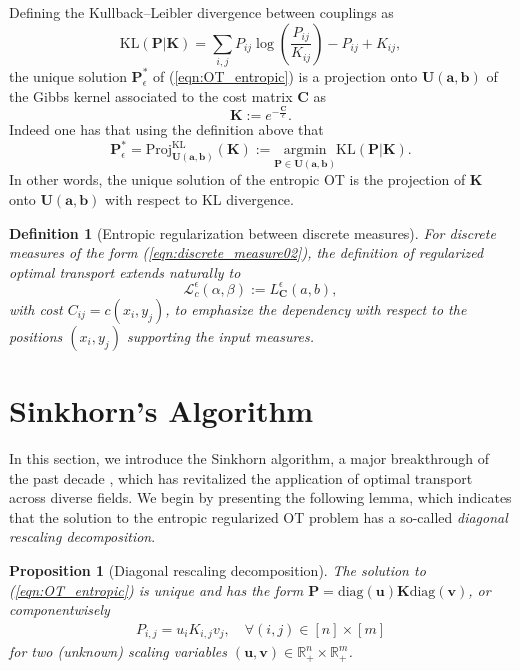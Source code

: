 \documentclass[11pt]{book}
\newtheorem{proposition}[theorem]{Proposition}
\newtheorem{definition}[theorem]{Definition}
\begin{document}
Defining the Kullback--Leibler divergence between couplings as
\begin{equation}
\text{KL}(\mathbf{P}|\mathbf{K}) = \sum_{i,j} P_{ij} \log \left(\frac{P_{ij}}{K_{ij}}\right) -P_{ij} + K_{ij}, \tag{4.6}
\end{equation}
the unique solution \(\mathbf{P}^*_{\epsilon}\) of (\ref{eqn:OT_entropic}) is a projection onto \(\mathbf{U}(\mathbf{a}, \mathbf{b})\) of the Gibbs kernel associated to the cost matrix \(\mathbf{C}\) as
\[
\mathbf{K} := e^{-\frac{\mathbf{C}}{\epsilon}}.
\]
Indeed one has that using the definition above that
\begin{equation}\label{eqn:KL_proj}
\mathbf{P}^*_{\epsilon} = \text{Proj}_{\mathbf{U}(\mathbf{a},\mathbf{b})}^{\text{KL}}(\mathbf{K}) := \underset{ \mathbf{P} \in \mathbf{U}(\mathbf{a},\mathbf{b})}{\mathrm{argmin}} \text{KL}(\mathbf{P} | \mathbf{K}).
\end{equation}
In other words, the unique solution of the entropic OT is the projection of $\mathbf{K}$ onto $\mathbf{U}(\mathbf{a},\mathbf{b})$ with respect to KL divergence.

\begin{definition}[Entropic regularization between discrete measures]
For discrete measures of the form (\ref{eqn:discrete_measure02}), the definition of regularized optimal transport extends naturally to
\begin{equation}
\mathcal{L}_{c}^{\epsilon}(\alpha, \beta) := L_{\mathbf{C}}^{\epsilon}(a, b),
\end{equation}
with cost \( C_{ij} = c(x_i, y_j) \), to emphasize the dependency with respect to the positions \( (x_i, y_j) \) supporting the input measures.
\end{definition}






\section[Sinkhorn]{Sinkhorn's Algorithm}


In this section, we introduce the Sinkhorn algorithm, a major breakthrough of the past decade \cite{cuturi2013sinkhorn}, which has revitalized the application of optimal transport across diverse fields. We begin by presenting the following lemma, which indicates that the solution to the entropic regularized OT problem has a so-called {\it diagonal rescaling decomposition}.


\begin{proposition}[Diagonal rescaling decomposition]\label{proposition:diagonal_rescaling}
The solution to (\ref{eqn:OT_entropic}) is unique and has the form $\mathbf{P} = \mathrm{diag}(\mathbf{u})\mathbf{K}\mathrm{diag}(\mathbf{v})$, or componentwisely
\begin{align*}
P_{i,j} = u_i K_{i,j} v_j,    \quad  \forall (i,j) \in [n] \times [m]
\end{align*}
for two (unknown) scaling variables $(\mathbf{u}, \mathbf{v}) \in \mathbb{R}_+^n \times \mathbb{R}_+^m$.
\end{proposition}
\end{document}

